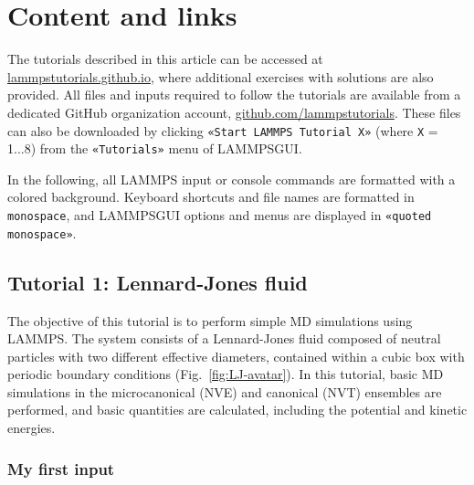 \documentclass[9pt,tutorial]{livecoms}
\newcommand{\lmpcmd}[1]{\hspace{0pt}\colorbox{listing}{\textcolor{command}{\small{#1}}}\hspace{0pt}} %
\newcommand{\flecmd}[1]{\textcolor{command}{\texttt{#1}}} %
\newcommand{\guicmd}[1]{\textcolor{command}{\texttt{«#1»}}} %
\newcommand{\lammpsgui}{\textsf{LAMMPS\textendash GUI}}
\begin{document}
\section{Content and links}

The tutorials described in this article can be accessed at
\href{https://lammpstutorials.github.io}{lammpstutorials.github.io},
where additional exercises with solutions are also provided.  All files
and inputs required to follow the tutorials are available from a
dedicated GitHub organization account,
\href{https://github.com/lammpstutorials}{github.com/lammpstutorials}.
These files can also be downloaded by clicking \guicmd{Start LAMMPS Tutorial X}
(where \texttt{X} = 1...8) from the \guicmd{Tutorials} menu of \lammpsgui{}.

In the following, all LAMMPS input or console commands are formatted
with a \lmpcmd{colored background}.  Keyboard shortcuts and
file names are formatted in \flecmd{monospace}, and \lammpsgui{} options and menus
are displayed in \guicmd{quoted monospace}.

\subsection{Tutorial 1: Lennard-Jones fluid}
\label{lennard-jones-label}

The objective of this tutorial is to perform simple MD simulations
using LAMMPS.  The system consists of a Lennard-Jones fluid composed of
neutral particles with two different effective diameters, contained
within a cubic box with periodic boundary conditions
(Fig.~\ref{fig:LJ-avatar}).  In this tutorial, basic MD simulations in
the microcanonical (NVE) and canonical (NVT) ensembles are performed,
and basic quantities are calculated, including the potential and kinetic
energies.

\subsubsection{My first input}
\end{document}
